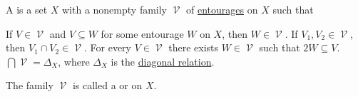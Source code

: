 \begin{definition}\label{def:uniform_space}\mcite\cite[sec. 8.1]{Engelking1989}
  A  is a set \( X \) with a nonempty family \( \mscrV \) of \hyperref[def:entourage]{entourages} on \( X \) such that
  \begin{defenum}
     If \( V \in \mscrV \) and \( V \subseteq W \) for some entourage \( W \) on \( X \), then \( W \in \mscrV \).
     If \( V_1, V_2 \in \mscrV \), then \( V_1 \cap V_2 \in \mscrV \).
     For every \( V \in \mscrV \) there exists \( W \in \mscrV \) such that \( 2W \subseteq V \).
     \( \bigcap \mscrV = \Delta_X \), where \( \Delta_X \) is the \hyperref[def:binary_relation/diagonal]{diagonal relation}.
  \end{defenum}

  The family \( \mscrV \) is called a  or  on \( X \).
\end{definition}


